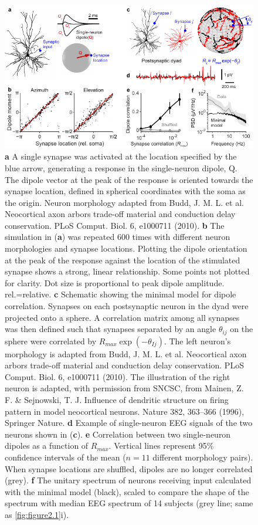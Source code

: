 \begin{figure}[b!]
    \centering
    \includegraphics[width=125mm]{Figures/chapter2/figure3.pdf}
    \caption{
	\textbf{a} A single synapse was activated at the location specified by the blue arrow, generating a response in the single-neuron dipole, Q. The dipole vector at the peak of the response is oriented towards the synapse location, defined in spherical coordinates with the soma as the origin. Neuron morphology adapted from Budd, J. M. L. et al. Neocortical axon arbors trade-off material and conduction delay conservation. PLoS Comput. Biol. 6, e1000711 (2010).
	\textbf{b} The simulation in (\textbf{a}) was repeated 600 times with different neuron morphologies and synapse locations. Plotting the dipole orientation at the peak of the response against the location of the stimulated synapse shows a strong, linear relationship. Some points not plotted for clarity. Dot size is proportional to peak dipole amplitude. rel.=relative. 
	\textbf{c} Schematic showing the minimal model for dipole correlation. Synapses on each postsynaptic neuron in the dyad were projected onto a sphere. A correlation matrix among all synapses was then defined such that synapses separated by an angle $\theta_{ij}$ on the sphere were correlated by $R_{max}\exp{(-\theta_{Ij})}$. The left neuron’s morphology is adapted from Budd, J. M. L. et al. Neocortical axon arbors trade-off material and conduction delay conservation. PLoS Comput. Biol. 6, e1000711 (2010). The illustration of the right neuron is adapted, with permission from SNCSC, from Mainen, Z. F. \& Sejnowski, T. J. Influence of dendritic structure on firing pattern in model neocortical neurons. Nature 382, 363–366 (1996), Springer Nature.
	\textbf{d} Example of single-neuron EEG signals of the two neurons shown in (\textbf{c}).
	\textbf{e} Correlation between two single-neuron dipoles as a function of $R_{max}$. Vertical lines represent 95\% confidence intervals of the mean ($n=11$ different morphology pairs). When synapse locations are shuffled, dipoles are no longer correlated (grey).
	\textbf{f} The unitary spectrum of neurons receiving input calculated with the minimal model (black), scaled to compare the shape of the spectrum with median EEG spectrum of 14 subjects (grey line; same as \autoref{fig:figure2.1}i).} 
    \label{fig:figure2.3}
\end{figure}

